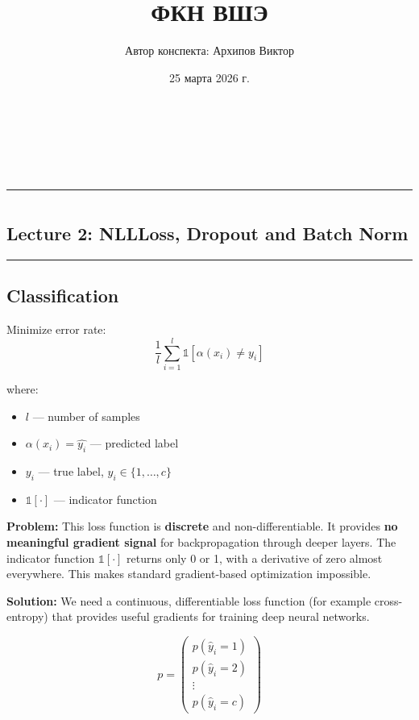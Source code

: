 \documentclass[12pt]{article}
\title{ФКН ВШЭ}
\author{Автор конспекта: Архипов Виктор}
\date{25 марта 2026 г.}
\makeatletter
\gdef\@course{}
\renewcommand{\maketitle}{%
  \begin{center}
    {\Large\textbf{\@title}}\\[0.3cm]
    {\Large\textbf{\@course}}\\[0.2cm]
    {\large\@author}\\[0.2cm]
    {\normalsize\@date}
  \end{center}
  \vspace{0.3cm}
  \noindent\rule{\textwidth}{0.5pt}
  \vspace{0.5cm}
}
\makeatother
\begin{document}
\thispagestyle{empty}
\maketitle




\makeatletter
\renewcommand{\tableofcontents}{%
  \section*{\contentsname}
  {\large
  }
}
\makeatother
\tableofcontents
\newpage
\begin{center}
\setcounter{section}{1}
\section*{Lecture 2: NLLLoss, Dropout and Batch Norm}
\vspace{0.3cm}
\noindent\rule{\textwidth}{0.5pt}
\end{center}

\subsection{Classification}
Minimize error rate:
$$\frac{1}{l} \sum_{i=1}^{l} \mathbb{1}[\alpha(x_i) \neq y_i]$$

where:
\begin{itemize}
  \item $l$ — number of samples
  \item $\alpha(x_i) = \hat{y_i}$ — predicted label
  \item $y_i$ — true label, $y_i \in \{1, \ldots, c\}$
  \item $\mathbb{1}[\cdot]$ — indicator function
\end{itemize}
\textbf{Problem:} This loss function is \textbf{discrete} and non-differentiable. It provides \textbf{no meaningful gradient signal} for backpropagation through deeper layers. The indicator function $\mathbb{1}[\cdot]$ returns only 0 or 1, with a derivative of zero almost everywhere. This makes standard gradient-based optimization impossible.

\textbf{Solution:} We need a continuous, differentiable loss function (for example cross-entropy) that provides useful gradients for training deep neural networks.

$$p = \begin{pmatrix}
p(\hat{y}_i = 1) \\
p(\hat{y}_i = 2) \\
\vdots \\
p(\hat{y}_i = c)
\end{pmatrix}$$
\end{document}

